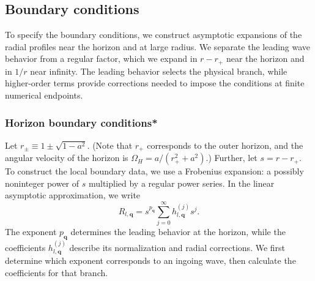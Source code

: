\documentclass[11pt]{article}
\begin{document}
\subsection{Boundary conditions}
To specify the boundary conditions, we construct asymptotic expansions of the radial profiles near the horizon and at large radius. We separate the leading wave behavior from a regular factor, which we expand in $r-r_+$ near the horizon and in $1/r$ near infinity. The leading behavior selects the physical branch, while higher-order terms provide corrections needed to impose the conditions at finite numerical endpoints.

\subsubsection{Horizon boundary conditions*}
Let $r_\pm \equiv 1 \pm \sqrt{1 - a^2}$. (Note that $r_+$ corresponds to the outer horizon, and the angular velocity of the horizon is $\Omega_H = a/(r_+^2+a^2)$.) Further, let $s = r - r_+$. To construct the local boundary data, we use a Frobenius expansion: a possibly noninteger power of $s$ multiplied by a regular power series. In the linear asymptotic approximation, we write
\begin{equation}
    \label{eq:horizon_series}
    R_{l,\mathbf q}
    = s^{p_{\mathbf q}}\sum_{j=0}^{\infty}h^{(j)}_{l,\mathbf q}s^j.
\end{equation}
The exponent $p_{\mathbf q}$ determines the leading behavior at the horizon, while the coefficients $h^{(j)}_{l,\mathbf q}$ describe its normalization and radial corrections. We first determine which exponent corresponds to an ingoing wave, then calculate the coefficients for that branch.
\end{document}
